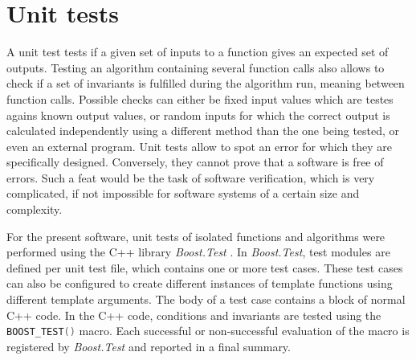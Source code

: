 \section{Unit tests}
\label{sec:unit_tests}
A unit test tests if a given set of inputs to a function gives an expected set of outputs.
Testing an algorithm containing several function calls also allows to check if a set of invariants
is fulfilled during the algorithm run, meaning between function calls.
Possible checks can either be fixed input values which are testes agains known output values,
or random inputs for which the correct output is calculated independently using a different 
method than the one being tested, or even an external program.
Unit tests allow to spot an error for which they are specifically designed. Conversely, they cannot 
prove that a software is free of errors. Such a feat would be the task of software verification, 
which is very complicated, if not impossible for software systems of a certain size and complexity.

For the present software, unit tests of isolated functions and algorithms were performed using the 
C++ library \textit{Boost.Test} \cite{web_boost_test}.
In \textit{Boost.Test}, test modules are defined per unit test file, which contains one or more test cases.
These test cases can also be configured to create different instances of template functions using
different template arguments. The body of a test case contains a block of normal C++ code.
In the C++ code, conditions and invariants are tested using the 
\lstinline[language=C++]|BOOST_TEST()| macro. Each successful or non-successful evaluation
of the macro is registered by \textit{Boost.Test} and reported in a final summary.
